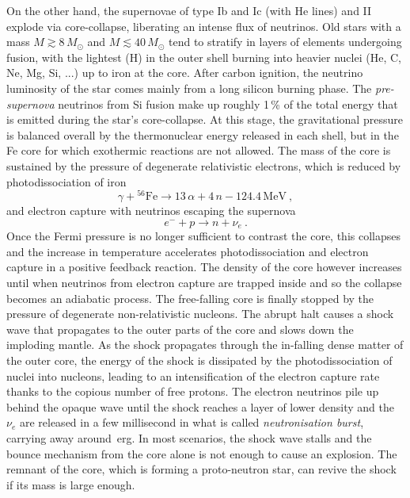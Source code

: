 On the other hand, the supernovae of type Ib and Ic (with He lines) and II explode via core-collapse, %
liberating an intense flux of neutrinos.
Old stars with a mass $M \gtrsim 8\,M_\odot$ and $M \lesssim 40\,M_\odot$ tend to stratify %
in layers of elements undergoing fusion, with the lightest (H) in the outer shell burning into heavier nuclei %
(He, C, Ne, Mg, Si, ...) up to iron at the core.
After carbon ignition, the neutrino luminosity of the star comes mainly from a long silicon burning phase.
The \emph{pre-supernova} neutrinos from Si fusion make up roughly 1\,\% of the total energy that is emitted during the star's core-collapse.
At this stage, the gravitational pressure is balanced overall by the thermonuclear energy released in each shell, %
but in the Fe core for which exothermic reactions are not allowed.
The mass of the core is sustained by the pressure of degenerate relativistic electrons, %
which is reduced by photodissociation of iron 
\begin{equation}
	\gamma +  {}^{56}\text{Fe} \to 13\,\alpha + 4\,n - 124.4\,\text{MeV}\ ,
\end{equation}
and electron capture with neutrinos escaping the supernova
\begin{equation}
	e^- + p \to n + \nu_e\ .
\end{equation}
Once the Fermi pressure is no longer sufficient to contrast the core, this collapses %
and the increase in temperature accelerates photodissociation and electron capture in a positive feedback reaction.
The density of the core however increases until when neutrinos from electron capture are trapped inside %
and so the collapse becomes an adiabatic process.
The free-falling core is finally stopped by the pressure of degenerate non-relativistic nucleons.
The abrupt halt causes a shock wave that propagates to the outer parts of the core and slows down the imploding mantle.
As the shock propagates through the in-falling dense matter of the outer core,
the energy of the shock is dissipated by the photodissociation of nuclei into nucleons, %
leading to an intensification of the electron capture rate thanks to the copious number of free protons.
The electron neutrinos pile up behind the opaque wave until the shock reaches a layer of lower density 
and the $\nu_e$ are released in a few millisecond in what is called \emph{neutronisation burst}, %
carrying away around \,erg.
In most scenarios, the shock wave stalls and the bounce mechanism from the core alone is not enough to cause an explosion.
The remnant of the core, which is forming a proto-neutron star, can revive the shock if its mass is large enough.
